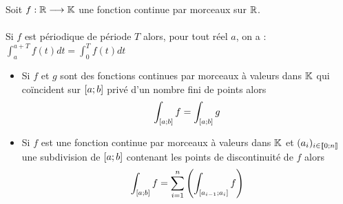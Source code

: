\begin{defprop}
    Soit \(f : \mathbb{R} \longrightarrow \mathbb{K}\) une fonction continue par morceaux sur \(\mathbb{R}\).\\~\\
    Si \(f\) est périodique de période \(T\) alors, pour tout réel \(a\), on a : \(\int^{a+T}_a f (t) dt = \int^T_0 f (t) dt\)
\end{defprop}
\begin{defprop}
   \begin{itemize}
        \item Si \(f\) et \(g\) sont des fonctions continues par morceaux à valeurs dans \(\mathbb{K}\) qui coïncident sur \(\left[a;b\right]\) privé d’un nombre fini de points alors
        \[\int_{\left[a;b\right]} f = \int_{\left[a;b\right]} g\]
        \item Si \(f\) est une fonction continue par morceaux à valeurs dans \(\mathbb{K}\) et \((a_i)_{i\in \left\llbracket0;n\right\rrbracket}\) une subdivision de \(\left[a;b\right]\) contenant les points de discontinuité de \(f\) alors
        \[\int_{\left[a;b\right]} f = \sum^n_{i=1} \left(\int_{\left[a_{i- 1};a_i\right]} f \right)\]
   \end{itemize}
\end{defprop}
